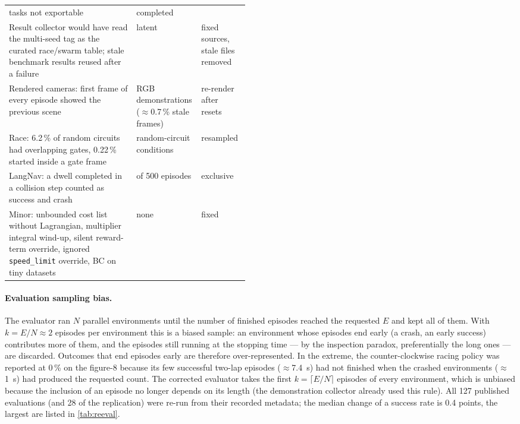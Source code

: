 \begin{table}[!htbp]
\begin{tabularx}{\linewidth}{>{\raggedright\arraybackslash}X>{\raggedright\arraybackslash}p{0.27\linewidth}>{\raggedright\arraybackslash}p{0.2\linewidth}}
tasks not exportable & completed\\
Result collector would have read the multi-seed tag as the curated race/swarm table; stale benchmark results reused
after a failure & latent & fixed sources, stale files removed\\
Rendered cameras: first frame of every episode showed the previous scene & RGB demonstrations ($\approx$0.7\,\% stale
frames) & re-render after resets\\
Race: 6.2\,\% of random circuits had overlapping gates, 0.22\,\% started inside a gate frame & random-circuit
conditions & resampled\\
LangNav: a dwell completed in a collision step counted as success and crash & 2 of 500 episodes & exclusive\\
Minor: unbounded cost list without Lagrangian, multiplier integral wind-up, silent reward-term override, ignored
\texttt{speed\_limit} override, BC on tiny datasets & none & fixed\\
\bottomrule\end{tabularx}
\end{table}

\paragraph{Evaluation sampling bias.} The evaluator ran $N$ parallel environments until the number of finished
episodes reached the requested $E$ and kept all of them. With $k=E/N\approx2$ episodes per environment this is a biased
sample: an environment whose episodes end early (a crash, an early success) contributes more of them, and the
episodes still running at the stopping time --- by the inspection paradox, preferentially the long ones --- are
discarded. Outcomes that end episodes early are therefore over-represented. In the extreme, the counter-clockwise
racing policy was reported at 0\,\% on the figure-8 because its few successful two-lap episodes ($\approx$\SI{7.4}{s})
had not finished when the crashed environments ($\approx$\SI{1}{s}) had produced the requested count. The corrected
evaluator takes the first $k=\lceil E/N\rceil$ episodes of every environment, which is unbiased because the
inclusion of an episode no longer depends on its length (the demonstration collector already used this rule). All
127 published evaluations (and 28 of the replication) were re-run from their recorded metadata; the median change of a success rate is 0.4
points, the largest are listed in \cref{tab:reeval}.

